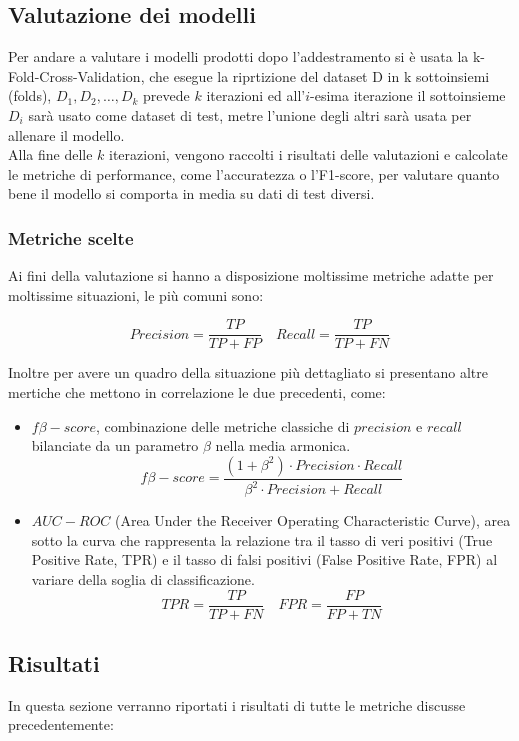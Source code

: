 \documentclass[italian,12pt,a4paper]{article}
\begin{document}
	\subsection{Valutazione dei modelli}
	Per andare a valutare i modelli prodotti dopo l'addestramento si è usata la k-Fold-Cross-Validation, che esegue la riprtizione del dataset D in k sottoinsiemi (folds), $D_1, D_2, \dots , D_k$ prevede $k$ iterazioni ed all'$i$-esima iterazione il sottoinsieme $D_i$ sarà usato come dataset di test, metre l'unione degli altri sarà usata per allenare il modello. \\
	\linebreak
	Alla fine delle $k$ iterazioni, vengono raccolti i risultati delle valutazioni e calcolate le metriche di performance, come l'accuratezza o l'F1-score, per valutare quanto bene il modello si comporta in media su dati di test diversi.

	
	\subsubsection{Metriche scelte}
	Ai fini della valutazione si hanno a disposizione moltissime metriche adatte per moltissime situazioni, le più comuni sono:
	
	$$Precision = \frac{TP}{TP+FP} \quad Recall = \frac{TP}{TP+FN}$$

	Inoltre per avere un quadro della situazione più dettagliato si presentano altre mertiche che mettono in correlazione le due precedenti, come:
	
		
	\begin{itemize}
		\item $f\beta-score$,  combinazione delle metriche classiche di $precision$ e $recall$ bilanciate da un parametro $\beta$ nella media armonica.
		$$f\beta-score = \frac{(1+ \beta^2) \cdot Precision \cdot Recall}{\beta^2 \cdot Precision + Recall}$$
		\item $AUC-ROC$ (Area Under the Receiver Operating Characteristic Curve), area sotto la curva che rappresenta la relazione tra il tasso di veri positivi (True Positive Rate, TPR) e il tasso di falsi positivi (False Positive Rate, FPR) al variare della soglia di classificazione.
		$$TPR = \frac{TP}{TP+FN} \quad FPR = \frac{FP}{FP+TN}$$
	
	\end{itemize} 

	\subsection{Risultati}
		In questa sezione verranno riportati i risultati di tutte le metriche discusse precedentemente:
	
\end{document}
